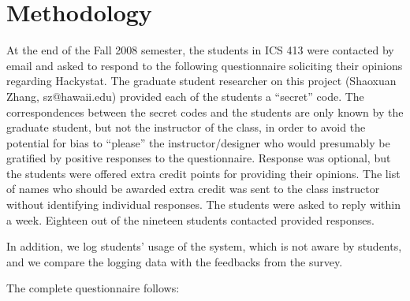 \documentclass[11pt]{article}
\begin{document}
\section{Methodology}
At the end of the Fall 2008 semester, the students in ICS 413 were contacted by email and asked to respond to the following questionnaire soliciting their opinions regarding Hackystat. The graduate student researcher on this project (Shaoxuan Zhang, sz@hawaii.edu) provided each of the students a ``secret'' code. The correspondences between the secret codes and the students are only known by the graduate student, but not the instructor of the class, in order to avoid the potential for bias to ``please'' the instructor/designer who would presumably be gratified by positive responses to the questionnaire. Response was optional, but the students were offered extra credit points for providing their opinions. The list of names who should be awarded extra credit was sent to the class instructor without identifying individual responses. The students were asked to reply within a week. Eighteen out of the nineteen students contacted provided responses. 

In addition, we log students' usage of the system, which is not aware by students, and we compare the logging data with the feedbacks from the survey.

The complete questionnaire follows:
\end{document}
